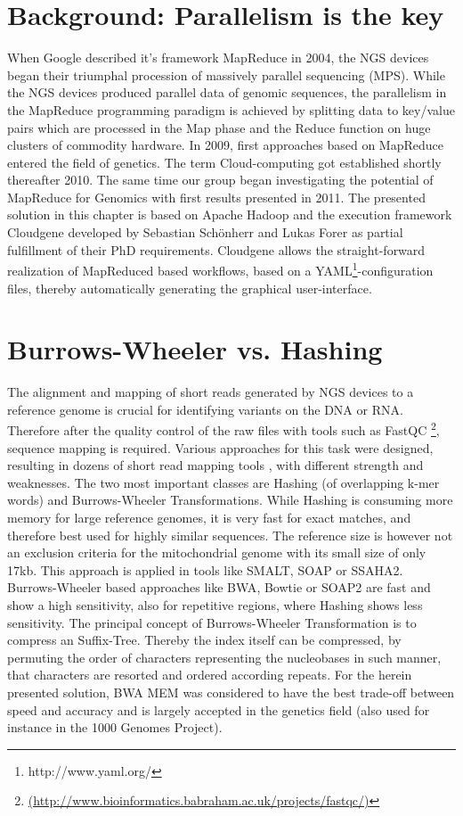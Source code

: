 \section{Background: Parallelism is the key}
When Google described it's framework MapReduce in 2004\cite{Dean2008}, the NGS devices began their triumphal procession of massively parallel sequencing (MPS). While the NGS devices produced parallel data of genomic sequences, the parallelism in the MapReduce programming paradigm is achieved by splitting data to key/value pairs which are processed in the Map phase and the Reduce function on huge clusters of commodity hardware. In 2009, first approaches based on MapReduce entered the field of genetics\cite{Schatz2009}. The term Cloud-computing got established shortly thereafter 2010\cite{Schatz2010}. The same time our group began investigating the potential of MapReduce for Genomics with first results presented in 2011\cite{DBLP:conf/gvd/SchonherrFWKSK11}. The presented solution in this chapter is based on Apache Hadoop and the execution framework Cloudgene\cite{Schonherr2012} developed by Sebastian Sch\"onherr and Lukas Forer as partial fulfillment of their PhD requirements. Cloudgene allows the straight-forward realization of MapReduced based workflows, based on a YAML\footnote{{http://www.yaml.org/}}-configuration files, thereby automatically generating the graphical user-interface. 

\section{Burrows-Wheeler vs. Hashing}
The alignment and mapping of short reads generated by NGS devices to a reference genome is crucial for identifying variants on the DNA or RNA. Therefore after the quality control of the raw files with tools such as FastQC \footnote{\url{(http://www.bioinformatics.babraham.ac.uk/projects/fastqc/)}}, sequence mapping is required. Various approaches for this task were designed, resulting in dozens of short read mapping tools  \cite{Hatem2013,Pabinger2013}, with different strength and weaknesses. The two most important classes are Hashing (of overlapping k-mer words) and Burrows-Wheeler Transformations. While Hashing is consuming more memory for large reference genomes, it is very fast for exact matches, and therefore best used for highly similar sequences. The reference size is however not an exclusion criteria for the mitochondrial genome with its small size of only 17kb. This approach is applied in tools like SMALT, SOAP or SSAHA2. Burrows-Wheeler based approaches like BWA\cite{Li2009}, Bowtie\cite{Langmead2009} or SOAP2 are fast and show a high sensitivity, also for repetitive regions, where Hashing shows less sensitivity. The principal concept of Burrows-Wheeler Transformation is to compress an Suffix-Tree. Thereby the index itself can be compressed, by permuting the order of characters representing the nucleobases in such manner, that characters are resorted and ordered according repeats. For the herein presented solution, BWA MEM\cite{Li2013a} was considered to have the best trade-off between speed and accuracy and is largely accepted in the genetics field (also used for instance in the 1000 Genomes Project\cite{Abecasis2012}).

